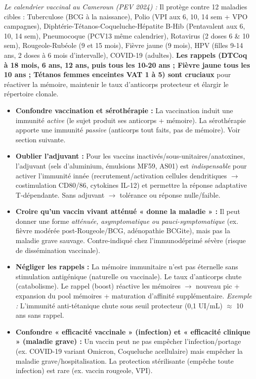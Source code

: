 \documentclass[11pt]{article}
\begin{document}
\emph{Le calendrier vaccinal au Cameroun (PEV 2024) :} Il protège contre 12 maladies cibles : Tuberculose (BCG à la naissance), Polio (VPI aux 6, 10, 14 sem + VPO campagnes), Diphtérie-Tétanos-Coqueluche-Hépatite B-Hib (Pentavalent aux 6, 10, 14 sem), Pneumocoque (PCV13 même calendrier), Rotavirus (2 doses 6 \& 10 sem), Rougeole-Rubéole (9 et 15 mois), Fièvre jaune (9 mois), HPV (filles 9-14 ans, 2 doses à 6 mois d'intervalle), COVID-19 (adultes). \textbf{Les rappels (DTCoq à 18 mois, 6 ans, 12 ans, puis tous les 10-20 ans ; Fièvre jaune tous les 10 ans ; Tétanos femmes enceintes VAT 1 à 5) sont cruciaux} pour réactiver la mémoire, maintenir le taux d'anticorps protecteur et élargir le répertoire clonale.

\begin{attention}
\begin{itemize}
    \item \textbf{Confondre vaccination et sérothérapie :} La vaccination induit une immunité \emph{active} (le sujet produit ses anticorps + mémoire). La sérothérapie apporte une immunité \emph{passive} (anticorps tout faits, pas de mémoire). Voir section suivante.
    \item \textbf{Oublier l'adjuvant :} Pour les vaccins inactivés/sous-unitaires/anatoxines, l'adjuvant (sels d'aluminium, émulsions MF59, AS01) est \emph{indispensable} pour activer l'immunité innée (recrutement/activation cellules dendritiques $\rightarrow$ costimulation CD80/86, cytokines IL-12) et permettre la réponse adaptative T-dépendante. Sans adjuvant $\rightarrow$ tolérance ou réponse nulle/faible.
    \item \textbf{Croire qu'un vaccin vivant atténué « donne la maladie » :} Il peut donner une forme \emph{atténuée, asymptomatique ou pauci-symptomatique} (ex. fièvre modérée post-Rougeole/BCG, adénopathie BCGite), mais pas la maladie grave sauvage. Contre-indiqué chez l'immunodéprimé sévère (risque de dissémination vaccinale).
    \item \textbf{Négliger les rappels :} La mémoire immunitaire n'est pas éternelle sans stimulation antigénique (naturelle ou vaccinale). Le taux d'anticorps chute (catabolisme). Le rappel (boost) réactive les mémoires $\rightarrow$ nouveau pic + expansion du pool mémoires + maturation d'affinité supplémentaire. \emph{Exemple :} L'immunité anti-tétanique chute sous seuil protecteur (0,1 UI/mL) $\approx$ 10 ans sans rappel.
    \item \textbf{Confondre « efficacité vaccinale » (infection) et « efficacité clinique » (maladie grave) :} Un vaccin peut ne pas empêcher l'infection/portage (ex. COVID-19 variant Omicron, Coqueluche acellulaire) mais empêcher la maladie grave/hospitalisation. La protection stérilisante (empêche toute infection) est rare (ex. vaccin rougeole, VPI).
\end{itemize}
\end{attention}
\end{document}
